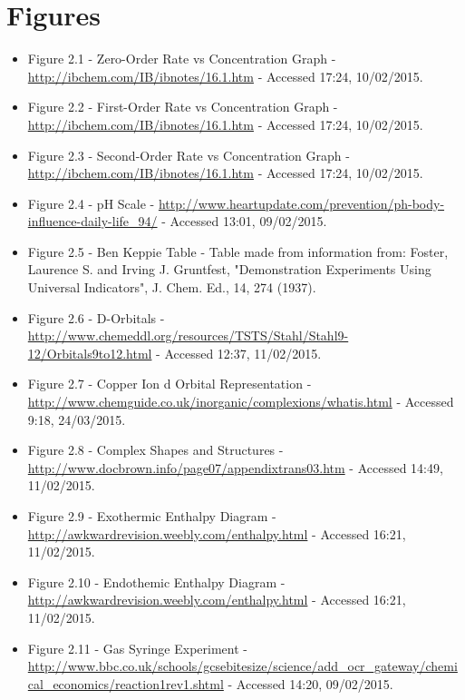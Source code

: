 \section{Figures}
\begin{itemize}

\item Figure 2.1 - Zero-Order Rate vs Concentration Graph - \url{http://ibchem.com/IB/ibnotes/16.1.htm} - Accessed 17:24, 10/02/2015.

\item Figure 2.2 - First-Order Rate vs Concentration Graph  - \url{http://ibchem.com/IB/ibnotes/16.1.htm} - Accessed 17:24, 10/02/2015.

\item Figure 2.3 - Second-Order Rate vs Concentration Graph  - \url{http://ibchem.com/IB/ibnotes/16.1.htm} - Accessed 17:24, 10/02/2015.

\item Figure 2.4 - pH Scale - \url{http://www.heartupdate.com/prevention/ph-body-influence-daily-life_94/} - Accessed 13:01, 09/02/2015. 

\item Figure 2.5 - Ben Keppie Table - Table made from information from: Foster, Laurence S. and Irving J. Gruntfest, "Demonstration Experiments Using Universal Indicators", J. Chem. Ed., 14, 274 (1937).

\item Figure 2.6 - D-Orbitals - \url{http://www.chemeddl.org/resources/TSTS/Stahl/Stahl9-12/Orbitals9to12.html} - Accessed 12:37, 11/02/2015.

\item Figure 2.7 - Copper Ion d Orbital Representation - \url{http://www.chemguide.co.uk/inorganic/complexions/whatis.html} - Accessed 9:18, 24/03/2015.

\item Figure 2.8 - Complex Shapes and Structures - \url{http://www.docbrown.info/page07/appendixtrans03.htm} - Accessed 14:49, 11/02/2015.


\item Figure 2.9 - Exothermic Enthalpy Diagram - \url{http://awkwardrevision.weebly.com/enthalpy.html} - Accessed 16:21, 11/02/2015.

\item Figure 2.10 - Endothemic Enthalpy Diagram - \url{http://awkwardrevision.weebly.com/enthalpy.html} - Accessed 16:21, 11/02/2015.

\item Figure 2.11 - Gas Syringe Experiment - \url{http://www.bbc.co.uk/schools/gcsebitesize/science/add_ocr_gateway/chemical_economics/reaction1rev1.shtml} - Accessed 14:20, 09/02/2015.


\end{itemize}
